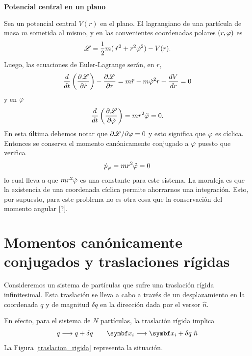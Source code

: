 \documentclass[10pt,oneside]{CBFT_book}
\begin{document}
\begin{ejemplo}{\bf Potencial central en un plano}

Sea un potencial central $ V(r) $ en el plano. El lagrangiano de una partícula de masa $m$ sometida al mismo,
y en las convenientes coordenadas polares $(r,\varphi)$ es
\[
	\mathscr{L} = \frac{1}{2} m ( \:\dot{r}^2 + r^2 \dot{\varphi}^2 ) - V(r).
\]
Luego, las ecuaciones de Euler-Lagrange serán, en $r$,
\[
	\frac{d^{\hspace{-0.05em}} {}}{d {t}^{\hspace{-0.05em}}}\left( \frac{\partial^{\hspace{-0.05em}} {\mathscr{L}}}{\partial {\dot{r}}^{\hspace{-0.05em}}}\right) - \frac{\partial^{\hspace{-0.05em}} {\mathscr{L}}}{\partial {r}^{\hspace{-0.05em}}} =
	m\ddot{r} - m\dot{\varphi}^2r + \frac{d^{\hspace{-0.05em}} {V}}{d {r}^{\hspace{-0.05em}}} = 0
\]
y en $\varphi$
\[
	\frac{d^{\hspace{-0.05em}} {}}{d {t}^{\hspace{-0.05em}}}\left( \frac{\partial^{\hspace{-0.05em}} {\mathscr{L}}}{\partial {\dot{\varphi}}^{\hspace{-0.05em}}}\right) = mr^2\ddot{\varphi} = 0.
\]
En esta última debemos notar que $\partial \mathscr{L} / \partial \varphi = 0 $ y esto significa que $\varphi$ es cíclica.
Entonces se conserva el momento canónicamente conjugado a $\varphi$ puesto que verifica 
\[
	\dot{p}_\varphi = mr^2\ddot{\varphi} = 0
\]
lo cual lleva a que $ m r^2\dot{\varphi} $ es una constante para este sistema. La moraleja es que la existencia de una 
coordenada cíclica permite ahorrarnos una integración.
Esto, por supuesto, para este problema no es otra cosa que la conservación del momento angular [?].

\end{ejemplo}

\section{Momentos canónicamente conjugados y traslaciones rígidas}

Consideremos un sistema de partículas que sufre una traslación rígida infinitesimal.
Esta traslación se lleva a cabo a través de un desplazamiento en la coordenada $ q $ y de magnitud 
$\delta q$ en la dirección dada por el versor $ \hat{n} $.

En efecto, para el sistema de $ N $ partículas, la traslación rígida implica
\[
	q \longrightarrow q + \delta q \qquad 
	\vb{x}_i \longrightarrow \vb{x}_i + \delta q \; \hat{n}
\]
La Figura \ref{traslacion_rigida} representa la situación.
\end{document}
